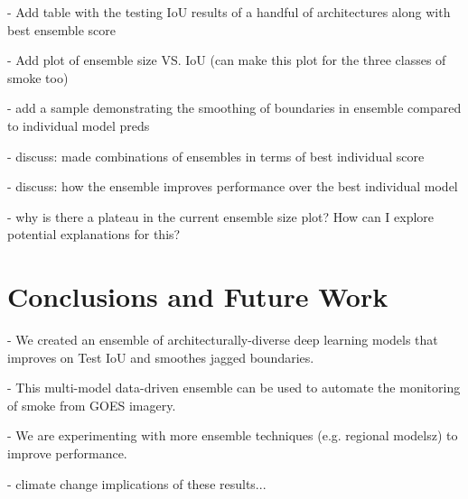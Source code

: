 \documentclass{article}
\begin{document}
- Add table with the testing IoU results of a handful of architectures along with best ensemble score 

- Add plot of ensemble size VS. IoU (can make this plot for the three classes of smoke too)

- add a sample demonstrating the smoothing of boundaries in ensemble compared to individual model preds

- discuss: made combinations of ensembles in terms of best individual score 

- discuss: how the ensemble improves performance over the best individual model

- why is there a plateau in the current ensemble size plot? How can I explore potential explanations for this? 

\section{Conclusions and Future Work}
- We created an ensemble of architecturally-diverse deep learning models that improves on Test IoU and smoothes jagged boundaries.

- This multi-model data-driven ensemble can be used to automate the monitoring of smoke from GOES imagery.

- We are experimenting with more ensemble techniques (e.g. regional modelsz) to improve performance.

- climate change implications of these results...




\end{document}
